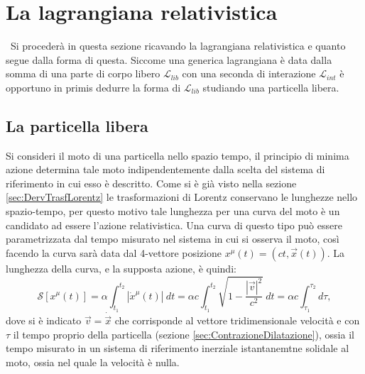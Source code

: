 \section{La lagrangiana relativistica}\
Si procederà in questa sezione ricavando la lagrangiana relativistica e quanto segue dalla forma di questa. Siccome una generica lagrangiana è data dalla somma di una parte di corpo libero $\mathcal{L}_{lib}$ con una seconda di interazione $\mathcal{L}_{int}$ è opportuno in primis dedurre la forma di $\mathcal{L}_{lib}$ studiando una particella libera.
\subsection{La particella libera}
Si consideri il moto di una particella nello spazio tempo, il principio di minima azione determina tale moto indipendentemente dalla scelta del sistema di riferimento in cui esso è descritto.
Come si è già visto nella sezione \ref{sec:DervTrasfLorentz} le trasformazioni di Lorentz conservano le lunghezze nello spazio-tempo, per questo motivo tale lunghezza per una curva del moto è un candidato ad essere l'azione relativistica. Una curva di questo tipo può essere parametrizzata dal tempo misurato nel sistema in cui si osserva il moto, così facendo la curva sarà data dal 4-vettore posizione $x^\mu(t)=(ct,\vec{x}(t))$. La lunghezza della curva, e la supposta azione, è quindi:
\begin{equation}
    \mathcal{S}[x^\mu(t)]=\alpha\int_{t_1}^{t_2} |\dot{x}^\mu(t)|\ dt= \alpha c\int_{t_1}^{t_2} \sqrt{1-\frac{|\vec{v}|^2}{c^2}}\ dt=\alpha c\int_{\tau_1}^{\tau_2}d\tau,
\end{equation}
dove si è indicato $\vec{v}=\dot{\vec{x}}$ che corrisponde al vettore tridimensionale velocità e con $\tau$ il tempo proprio della particella (sezione \ref{sec:ContrazioneDilatazione}), ossia il tempo misurato in un sistema di riferimento inerziale istantanemtne solidale al moto, ossia nel quale la velocità è nulla.\\

